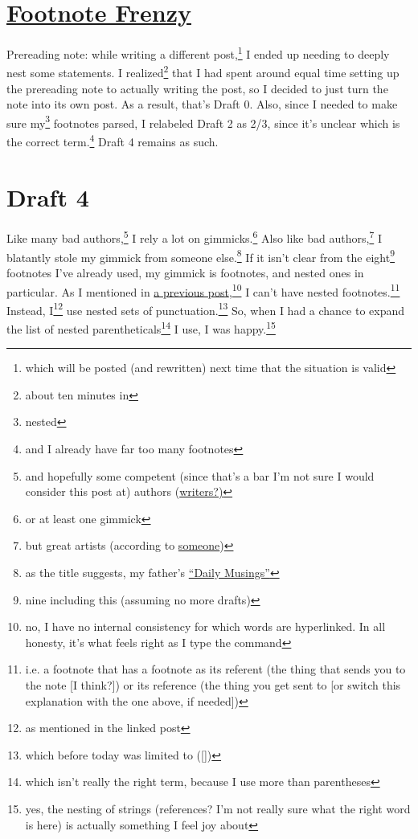 \documentclass[a4paper]{article}
\newcommand{\say}[1]{``#1''}
\newcommand{\1}{\={a}}
\newcommand{\2}{\={e}}
\newcommand{\3}{\={\i}}
\newcommand{\4}{\=o}
\newcommand{\5}{\=u}
\newcommand{\6}{\={A}}
\newcommand{\<}{\textless}
\renewcommand{\>}{\textgreater}
\renewcommand{\,}{\textsuperscript{,}}
\begin{document}
\doublespacing
\section{\href{footnote-frenzy.html}{Footnote Frenzy}}
Prereading note: while writing a different post,\footnote{which will be posted (and rewritten) next time that the situation is valid} I ended up needing to deeply nest some statements.
I realized\footnote{about ten minutes in} that I had spent around equal time setting up the prereading note to actually writing the post, so I decided to just turn the note into its own post.
As a result, that's Draft 0.
Also, since I needed to make sure my\footnote{nested} footnotes parsed, I relabeled Draft 2 as 2/3, since it's unclear which is the correct term.\footnote{and I already have far too many footnotes}
Draft 4 remains as such.
\section{Draft 4}
Like many bad authors,\footnote{and hopefully some competent (since that's a bar I'm not sure I would consider this post at) authors (\href{https://archangelink.com/writer-versus-author/}{writers?)}} I rely a lot on gimmicks.\footnote{or at least one gimmick}
Also like bad authors,\footnote{but great artists (according to \href{https://quoteinvestigator.com/2013/03/06/artists-steal/}{someone})} I blatantly stole my gimmick from someone else.\footnote{as the title suggests, my father's \href{http://www.cs.grinnell.edu/~rebelsky/musings/}{\say{Daily Musings}}}
If it isn't clear from the eight\footnote{nine including this (assuming no more drafts)} footnotes I've already used, my gimmick is footnotes, and nested ones in particular.
As I mentioned in \href{https://j.rebelsky.com/arranging-for-bagpipe}{a previous post},\footnote{no, I have no internal consistency for which words are hyperlinked. In all honesty, it's what feels right as I type the command} I can't have nested footnotes.\footnote{i.e. a footnote that has a footnote as its referent (the thing that sends you to the note [I think?]) or its reference (the thing you get sent to [or switch this explanation with the one above, if needed])}
Instead, I\footnote{as mentioned in the linked post} use nested sets of punctuation.\footnote{which before today was limited to ([])}
So, when I had a chance to expand the list of nested parentheticals\footnote{which isn't really the right term, because I use more than parentheses} I use, I was happy.\footnote{yes, the nesting of strings (references? I'm not really sure what the right word is here) is actually something I feel joy about}
\end{document}
